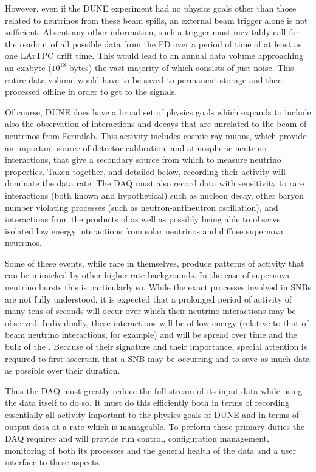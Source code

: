 However, even if the DUNE experiment had no physics goals other than
those related to neutrinos from these beam spills, an external beam
trigger alone is not sufficient. 
Absent any other information, such a trigger must inevitably call for
the readout of all possible data from the FD over a period of time of
at least as one LArTPC drift time. 
This would lead to an annual data volume approaching an exabyte
($10^{18}$ bytes) the vast majority of which consists of just noise. 
This entire data volume would have to be saved to permanent storage
and then processed offline in order to get to the signals.

Of course, DUNE does have a broad set of physics goals which expands
to include also the observation of interactions and decays that are
unrelated to the beam of neutrinos from Fermilab. 
This activity includes cosmic ray muons, which provide an important
source of detector calibration, and atmospheric neutrino interactions,
that give a secondary source from which to measure neutrino
properties. 
Taken together, and detailed below, recording their activity will
dominate the data rate.
The DAQ must also record data with sensitivity to rare interactions
(both known and hypothetical) such as nucleon decay, other baryon
number violating processes (such as neutron-antineutron oscillation),
and interactions from the products of  as well as possibly
being able to observe isolated low energy interactions from solar
neutrinos and diffuse supernova neutrinos. 

Some of these events, while rare in themselves, produce patterns of
activity that can be mimicked by other higher rate backgrounds.
In the case of supernova neutrino bursts this is particularly so. 
While the exact processes involved in SNBs are not fully understood,
it is expected that a prolonged period of activity of many tens of
seconds will occur over which their neutrino interactions may be
observed. 
Individually, these interactions will be of low energy (relative to
that of beam neutrino interactions, for example) and will be spread
over time and the bulk of the . 
Because of their signature and their importance, special attention is
required to first ascertain that a SNB may be occurring and to save as
much data as possible over their duration.

Thus the DAQ must greatly reduce the full-stream of its input data
while using the data itself to do so. 
It must do this efficiently both in terms of recording essentially all
activity important to the physics goals of DUNE and in terms of output
data at a rate which is manageable.  
To perform these primary duties the DAQ requires and will provide run
control, configuration management, monitoring of both its processes
and the general health of the data and a user interface to these
aspects.  

